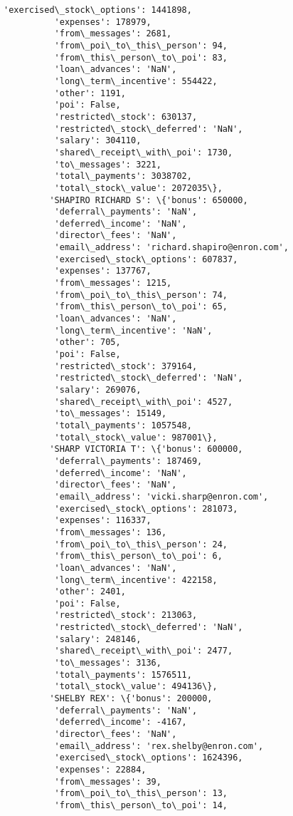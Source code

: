 \documentclass[11pt]{article}
\begin{document}
\begin{Verbatim}[commandchars=\\\{\}]
          'exercised\_stock\_options': 1441898,
          'expenses': 178979,
          'from\_messages': 2681,
          'from\_poi\_to\_this\_person': 94,
          'from\_this\_person\_to\_poi': 83,
          'loan\_advances': 'NaN',
          'long\_term\_incentive': 554422,
          'other': 1191,
          'poi': False,
          'restricted\_stock': 630137,
          'restricted\_stock\_deferred': 'NaN',
          'salary': 304110,
          'shared\_receipt\_with\_poi': 1730,
          'to\_messages': 3221,
          'total\_payments': 3038702,
          'total\_stock\_value': 2072035\},
         'SHAPIRO RICHARD S': \{'bonus': 650000,
          'deferral\_payments': 'NaN',
          'deferred\_income': 'NaN',
          'director\_fees': 'NaN',
          'email\_address': 'richard.shapiro@enron.com',
          'exercised\_stock\_options': 607837,
          'expenses': 137767,
          'from\_messages': 1215,
          'from\_poi\_to\_this\_person': 74,
          'from\_this\_person\_to\_poi': 65,
          'loan\_advances': 'NaN',
          'long\_term\_incentive': 'NaN',
          'other': 705,
          'poi': False,
          'restricted\_stock': 379164,
          'restricted\_stock\_deferred': 'NaN',
          'salary': 269076,
          'shared\_receipt\_with\_poi': 4527,
          'to\_messages': 15149,
          'total\_payments': 1057548,
          'total\_stock\_value': 987001\},
         'SHARP VICTORIA T': \{'bonus': 600000,
          'deferral\_payments': 187469,
          'deferred\_income': 'NaN',
          'director\_fees': 'NaN',
          'email\_address': 'vicki.sharp@enron.com',
          'exercised\_stock\_options': 281073,
          'expenses': 116337,
          'from\_messages': 136,
          'from\_poi\_to\_this\_person': 24,
          'from\_this\_person\_to\_poi': 6,
          'loan\_advances': 'NaN',
          'long\_term\_incentive': 422158,
          'other': 2401,
          'poi': False,
          'restricted\_stock': 213063,
          'restricted\_stock\_deferred': 'NaN',
          'salary': 248146,
          'shared\_receipt\_with\_poi': 2477,
          'to\_messages': 3136,
          'total\_payments': 1576511,
          'total\_stock\_value': 494136\},
         'SHELBY REX': \{'bonus': 200000,
          'deferral\_payments': 'NaN',
          'deferred\_income': -4167,
          'director\_fees': 'NaN',
          'email\_address': 'rex.shelby@enron.com',
          'exercised\_stock\_options': 1624396,
          'expenses': 22884,
          'from\_messages': 39,
          'from\_poi\_to\_this\_person': 13,
          'from\_this\_person\_to\_poi': 14,

\end{Verbatim}
\end{document}
